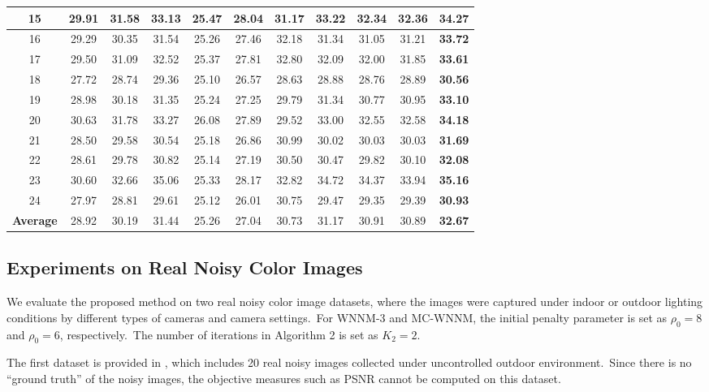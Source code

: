 \begin{table}[!htbp]
\begin{center}
\begin{tabular}{|c||c|c|c|c|c|c|c|c|c|c|}
\\
\hline
15& 29.91 & 31.58 & 33.13 & 25.47 & 28.04 & 31.17 & 33.22 & 32.34 & 32.36 & \textbf{34.27}
\\
\hline
16& 29.29 & 30.35 & 31.54 & 25.26 & 27.46 & 32.18 & 31.34 & 31.05 & 31.21 & \textbf{33.72}
\\
\hline
17& 29.50 & 31.09 & 32.52 & 25.37 & 27.81 & 32.80 & 32.09 & 32.00 & 31.85 & \textbf{33.61}
\\
\hline
18& 27.72 & 28.74 & 29.36 & 25.10 & 26.57 & 28.63 & 28.88 & 28.76 & 28.89 & \textbf{30.56}
\\
\hline
19& 28.98 & 30.18 & 31.35 & 25.24 & 27.25 & 29.79 & 31.34 & 30.77 & 30.95 & \textbf{33.10}
\\
\hline
20& 30.63 & 31.78 & 33.27 & 26.08 & 27.89 & 29.52 & 33.00 & 32.55 & 32.58 & \textbf{34.18}
\\
\hline
21& 28.50 & 29.58 & 30.54 & 25.18 & 26.86 & 30.99 & 30.02 & 30.03 & 30.03 & \textbf{31.69}
\\
\hline
22& 28.61 & 29.78 & 30.82 & 25.14 & 27.19 & 30.50 & 30.47 & 29.82 & 30.10 & \textbf{32.08}
\\
\hline
23& 30.60 & 32.66 & 35.06 & 25.33 & 28.17 & 32.82 & 34.72 & 34.37 & 33.94 & \textbf{35.16}
\\
\hline
24& 27.97 & 28.81 & 29.61 & 25.12 & 26.01 & 30.75 & 29.47 & 29.35 & 29.39 & \textbf{30.93}
\\
\hline
\textbf{Average}
& 28.92 & 30.19 & 31.44 & 25.26 & 27.04 & 30.73 & 31.17 & 30.91 & 30.89 & \textbf{32.67}
\\
\hline
\end{tabular}
\end{center}
\end{table}

\subsection{Experiments on Real Noisy Color Images}

We evaluate the proposed method on two real noisy color image datasets, where the images were captured under indoor or outdoor lighting conditions by different types of cameras and camera settings.\ For WNNM-3 and MC-WNNM, the initial penalty parameter is set as $\rho_{0}=8$ and $\rho_{0}=6$, respectively.\ The number of iterations in Algorithm 2 is set as $K_{2}=2$.

The first dataset is provided in \cite{ncwebsite}, which includes 20 real noisy images collected under uncontrolled outdoor environment.\ Since there is no ``ground truth'' of the noisy images, the objective measures such as PSNR cannot be computed on this dataset.

